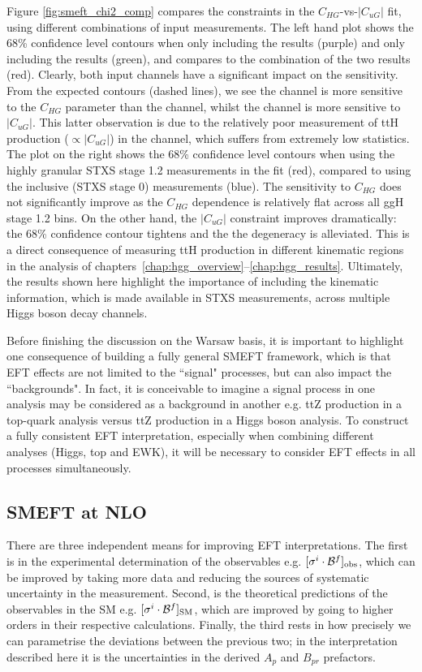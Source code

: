Figure \ref{fig:smeft_chi2_comp} compares the constraints in the $C_{HG}$-vs-$|C_{uG}|$ fit, using different combinations of input measurements. The left hand plot shows the 68\% confidence level contours when only including the \Hgg results (purple) and only including the \Hfl results (green), and compares to the combination of the two results (red). Clearly, both input channels have a significant impact on the sensitivity. From the expected contours (dashed lines), we see the \Hfl channel is more sensitive to the $C_{HG}$ parameter than the \Hgg channel, whilst the \Hgg channel is more sensitive to $|C_{uG}|$. This latter observation is due to the relatively poor measurement of ttH production ($\propto|C_{uG}|$) in the \Hfl channel, which suffers from extremely low statistics. The plot on the right shows the 68\% confidence level contours when using the highly granular STXS stage 1.2 measurements in the fit (red), compared to using the inclusive (STXS stage 0) measurements (blue). The sensitivity to $C_{HG}$ does not significantly improve as the $C_{HG}$ dependence is relatively flat across all ggH stage 1.2 bins. On the other hand, the $|C_{uG}|$ constraint improves dramatically: the 68\% confidence contour tightens and the the degeneracy is alleviated. This is a direct consequence of measuring ttH production in different kinematic regions in the \Hgg analysis of chapters~\ref{chap:hgg_overview}--\ref{chap:hgg_results}. Ultimately, the results shown here highlight the importance of including the kinematic information, which is made available in STXS measurements, across multiple Higgs boson decay channels.

Before finishing the discussion on the Warsaw basis, it is important to highlight one consequence of building a fully general SMEFT framework, which is that EFT effects are not limited to the ``signal" processes, but can also impact the ``backgrounds". In fact, it is conceivable to imagine a signal process in one analysis may be considered as a background in another e.g. ttZ production in a top-quark analysis versus ttZ production in a Higgs boson analysis. To construct a fully consistent EFT interpretation, especially when combining different analyses (Higgs, top and EWK), it will be necessary to consider EFT effects in all processes simultaneously.


\subsection{SMEFT at NLO}
There are three independent means for improving EFT interpretations. The first is in the experimental determination of the observables e.g. $[\sigma^i\cdot\mathcal{B}^f]_{\rm{obs}}$, which can be improved by taking more data and reducing the sources of systematic uncertainty in the measurement. Second, is the theoretical predictions of the observables in the SM e.g. $[\sigma^i\cdot\mathcal{B}^f]_{\rm{SM}}$, which are improved by going to higher orders in their respective calculations. Finally, the third rests in how precisely we can parametrise the deviations between the previous two; in the interpretation described here it is the uncertainties in the derived $A_p$ and $B_{pr}$ prefactors.

